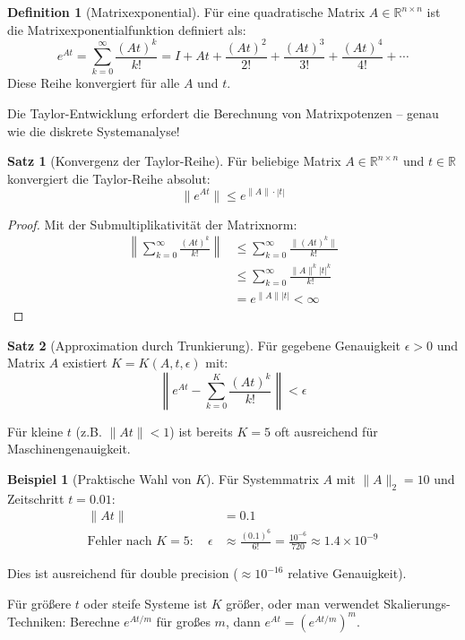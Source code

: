 \documentclass[a4paper,12pt]{report}
\theoremstyle{definition}
\newtheorem{definition}{Definition}
\newtheorem{beispiel}{Beispiel}
\newtheorem{satz}{Satz}
\begin{document}
	\begin{definition}[Matrixexponential]
		Für eine quadratische Matrix $A \in \mathbb{R}^{n \times n}$ ist die Matrixexponentialfunktion definiert als:
		\[
		e^{At} = \sum_{k=0}^{\infty} \frac{(At)^k}{k!} = I + At + \frac{(At)^2}{2!} + \frac{(At)^3}{3!} + \frac{(At)^4}{4!} + \cdots
		\]
		Diese Reihe konvergiert für alle $A$ und $t$.
	\end{definition}
	
	Die Taylor-Entwicklung erfordert die Berechnung von Matrixpotenzen -- genau wie die diskrete Systemanalyse!
	
	\begin{satz}[Konvergenz der Taylor-Reihe]
		Für beliebige Matrix $A \in \mathbb{R}^{n \times n}$ und $t \in \mathbb{R}$ konvergiert die Taylor-Reihe absolut:
		\[
		\|e^{At}\| \leq e^{\|A\| \cdot |t|}
		\]
	\end{satz}
	
	\begin{proof}
		Mit der Submultiplikativität der Matrixnorm:
		\begin{align}
			\left\| \sum_{k=0}^{\infty} \frac{(At)^k}{k!} \right\| &\leq \sum_{k=0}^{\infty} \frac{\|(At)^k\|}{k!} \\
			&\leq \sum_{k=0}^{\infty} \frac{\|A\|^k |t|^k}{k!} \\
			&= e^{\|A\| |t|} < \infty
		\end{align}
	\end{proof}
	
	\begin{satz}[Approximation durch Trunkierung]
		Für gegebene Genauigkeit $\epsilon > 0$ und Matrix $A$ existiert $K = K(A, t, \epsilon)$ mit:
		\[
		\left\| e^{At} - \sum_{k=0}^{K} \frac{(At)^k}{k!} \right\| < \epsilon
		\]
		
		Für kleine $t$ (z.B. $\|At\| < 1$) ist bereits $K = 5$ oft ausreichend für Maschinengenauigkeit.
	\end{satz}
	
	\begin{beispiel}[Praktische Wahl von $K$]
		Für Systemmatrix $A$ mit $\|A\|_2 = 10$ und Zeitschritt $t = 0.01$:
		\begin{align}
			\|At\| &= 0.1 \\
			\text{Fehler nach } K=5: \quad \epsilon &\approx \frac{(0.1)^6}{6!} = \frac{10^{-6}}{720} \approx 1.4 \times 10^{-9}
		\end{align}
		
		Dies ist ausreichend für double precision ($\approx 10^{-16}$ relative Genauigkeit).
		
		Für größere $t$ oder steife Systeme ist $K$ größer, oder man verwendet Skalierungs-Techniken: Berechne $e^{At/m}$ für großes $m$, dann $e^{At} = (e^{At/m})^m$.
	\end{beispiel}
	
\end{document}
